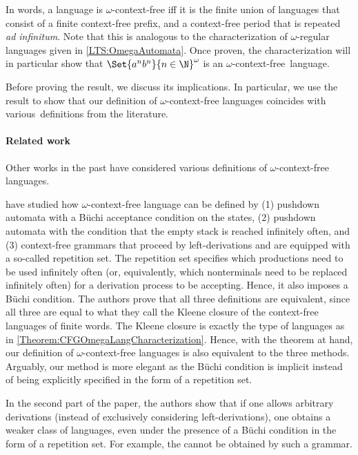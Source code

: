 \documentclass[../../diss.tex]{subfiles}
\begin{document}
In words, a language is $\omega$-context-free iff it is the finite union of languages that consist of a finite context-free prefix, and a context-free period that is repeated \emph{ad infinitum}.
Note that this is analogous to the characterization of $\omega$-regular languages given in \cref{LTS:OmegaAutomata}.
Once proven, the characterization will in particular show that $\Set{a^n b^n}{n \in \N}^\omega$ is an $\omega$-context-free~language.

Before proving the result, we discuss its implications.
In particular, we use the result to show that our definition of $\omega$-context-free languages coincides with various~definitions from the literature.

\paragraph{Related work}

Other works in the past have considered various definitions of $\omega$-context-free languages.

 have studied how $\omega$-context-free language can be defined by (1) pushdown automata with a Büchi acceptance condition on the states, (2) pushdown automata with the condition that the empty stack is reached infinitely often, and (3) context-free grammars that proceed by left-derivations and are equipped with a so-called repetition set.
The repetition set specifies which productions need to be used infinitely often (or, equivalently, which nonterminals need to be replaced infinitely often) for a derivation process to be accepting.
Hence, it also imposes a Büchi condition.
The authors prove that all three definitions are equivalent, since all three are equal to what they call the Kleene closure of the context-free languages of finite words.
The Kleene closure is exactly the type of languages as in \cref{Theorem:CFGOmegaLangCharacterization}.
Hence, with the theorem at hand, our definition of $\omega$-context-free languages is also equivalent to the three methods.
Arguably, our method is more elegant as the Büchi condition is implicit instead of being explicitly specified in the form of a repetition set.

In the second part of the paper, the authors show that if one allows arbitrary derivations (instead of exclusively considering left-derivations), one obtains a weaker class of languages, even under the presence of a Büchi condition in the form of a repetition set.
For example, the  cannot be obtained by such a grammar.
\end{document}
